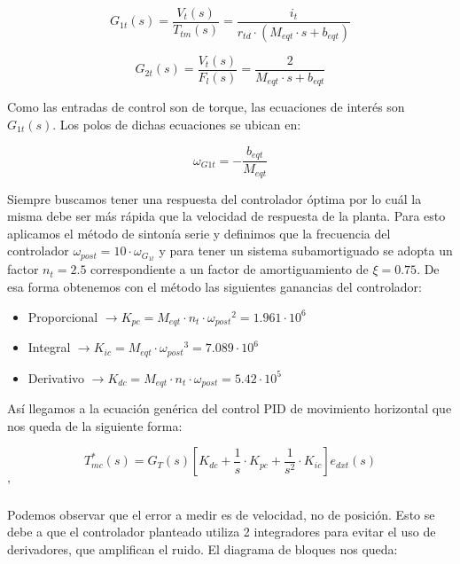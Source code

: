 \documentclass[11pt]{article}
\begin{document}
\begin{equation}
	\label{eq:sistema_carro_simplificado_laplace_G1t}
	G_{1t}(s)=\frac{V_{t}(s)}{T_{tm}(s)}=\frac{i_{t}}{r_{td}\cdot (M_{eqt}\cdot s+b_{eqt})}
\end{equation}

\begin{equation}
	\label{eq:sistema_carro_simplificado_laplace_G2t}
	G_{2t}(s)=\frac{V_{t}(s)}{F_{l}(s)}=\frac{2}{M_{eqt}\cdot s+b_{eqt}}
\end{equation}

Como las entradas de control son de torque, las ecuaciones de interés son $G_{1t}(s)$. Los polos de dichas ecuaciones se ubican en:

\begin{equation}
	\label{eq:sistema_carro_simplificado_laplace_polos}
	\omega_{G1t}=-\frac{b_{eqt}}{M_{eqt}}
\end{equation}

Siempre buscamos tener una respuesta del controlador óptima por lo cuál la misma debe ser más rápida que la velocidad de respuesta de la planta. Para esto aplicamos el método de sintonía serie y definimos que la frecuencia del controlador $\omega_{post}=10\cdot \omega_{G_{1t}}$ y para tener un sistema  subamortiguado se adopta un factor $n_{t}=2.5$ correspondiente a un factor de amortiguamiento de $\xi =0.75$. De esa forma obtenemos con el método las siguientes ganancias del controlador:

\begin{itemize}
	\item Proporcional $\rightarrow K_{pc} = M_{eqt}\cdot n_{t}\cdot {\omega_{post}}^{2} = 1.961 \cdot 10^6$
	\item Integral $\rightarrow K_{ic} = M_{eqt}\cdot {\omega_{post}}^{3}  = 7.089 \cdot 10^6$
	\item Derivativo $\rightarrow K_{dc} = M_{eqt}\cdot n_{t}\cdot {\omega_{post}} = 5.42 \cdot 10^5$
\end{itemize}

Así llegamos a la ecuación genérica del control PID de movimiento horizontal que nos queda de la siguiente forma:

\begin{equation}
	\label{eq:sistema_carro_simplificado_laplace_controlador}
	T_{mc}^{*}(s)=G_{T}(s)\left [ K_{dc}+\frac{1}{s}\cdot K_{pc}+\frac{1}{s^{2}}\cdot K_{ic} \right ] e_{dxt}(s)
\end{equation}'

Podemos observar que el error a medir es de velocidad, no de posición. Esto se debe a que el controlador planteado utiliza 2 integradores para evitar el uso de derivadores, que amplifican el ruido. El diagrama de bloques nos queda:
\end{document}
